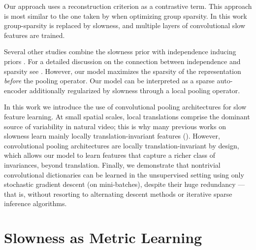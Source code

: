 Our approach uses a reconstruction criterion as a contrastive term. This
approach is most similar to the one taken by \cite{groupSparsity} when
optimizing group sparsity. In this work group-sparsity is replaced by slowness,
and multiple layers of convolutional slow features are trained. 

Several other studies combine the slowness prior with independence inducing
priors \cite{complexCells, Cadieu, zou2012deep}. For a detailed discussion on
the connection between independence and sparsity see \cite{Huyvarinen}.
However, our model maximizes the sparsity of the representation \emph{before}
the pooling operator. Our model can be interpreted as a sparse auto-encoder
additionally regularized by slowness through a local pooling operator.   

In this work we introduce the use of convolutional pooling architectures for
slow feature learning.  At small spatial scales, local translations comprise
the dominant source of variability in natural video; this is why many previous
works on slowness learn mainly locally translation-invariant features
(\cite{SFA,SSA,complexCells}). However, convolutional pooling architectures are
locally translation-invariant by design, which allows our model to learn
features that capture a richer class of invariances, beyond translation.
Finally, we demonstrate that nontrivial convolutional dictionaries can be
learned in the unsupervised setting using only stochastic gradient descent (on
mini-batches), despite their huge redundancy --- that is, without resorting to
alternating descent methods or iterative sparse inference algorithms. 


\section{Slowness as Metric Learning } \label{sec:slowmetric}

